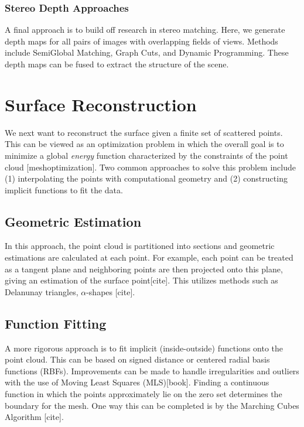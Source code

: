 \documentclass[10pt,twocolumn,letterpaper]{article}
\begin{document}
\subsubsection{Stereo Depth Approaches}

A final approach is to build off research in stereo matching. Here, we generate depth maps for all pairs of images with overlapping fields of views. Methods include SemiGlobal Matching, Graph Cuts, and Dynamic Programming.\cite{sgm,taxonomy} These depth maps can be fused to extract the structure of the scene.\cite{fuse}


\section{Surface Reconstruction}
We next want to reconstruct the surface given a finite set of scattered points.  This can be viewed as an optimization problem in which the overall goal is to minimize a global \textit{energy} function characterized by the constraints of the point cloud [meshoptimization].  Two common approaches to solve this problem include (1) interpolating the points with computational geometry and (2) constructing implicit functions to fit the data.

\subsection{ Geometric Estimation }
In this approach, the point cloud is partitioned into sections and geometric estimations are calculated at each point. For example, each point can be treated as a tangent plane and neighboring points are then projected onto this plane, giving an estimation of the surface point[cite].  This utilizes methods such as Delanunay triangles, $\alpha$-shapes [cite]. 

\subsection{ Function Fitting}
A more rigorous approach is to fit implicit (inside-outside) functions onto the point cloud.  This can be based on signed distance or centered radial basis functions (RBFs).\cite{poisson}  Improvements can be made to handle irregularities and outliers with the use of Moving Least Squares (MLS)[book].  Finding a continuous function in which the points approximately lie on the zero set determines the boundary for the mesh.  One way this can be completed is by the Marching Cubes Algorithm [cite].
\end{document}
